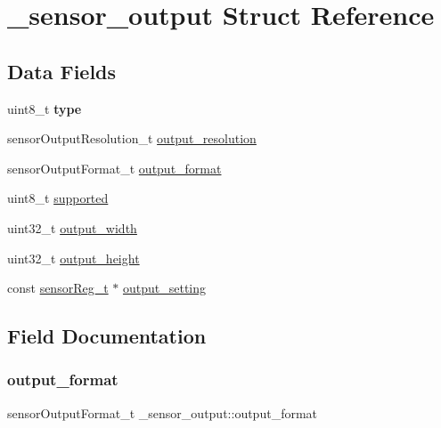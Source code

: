 \hypertarget{struct__sensor__output}{}\section{\+\_\+sensor\+\_\+output Struct Reference}
\label{struct__sensor__output}
\subsection*{Data Fields}
\begin{DoxyCompactItemize}
\item 
\mbox{\label{struct__sensor__output_a0d168a11e98089027c6a95677aca0c9e}} 
uint8\+\_\+t {\bfseries type}
\item 
sensor\+Output\+Resolution\+\_\+t \mbox{\hyperlink{struct__sensor__output_a964e50869cb795d102b326c817c6c6a0}{output\+\_\+resolution}}
\item 
sensor\+Output\+Format\+\_\+t \mbox{\hyperlink{struct__sensor__output_ae045b0c66fe0eb01c94f86201d7201b2}{output\+\_\+format}}
\item 
uint8\+\_\+t \mbox{\hyperlink{struct__sensor__output_adb2d9d82d9f87b0381d6e4b5f9a38e9b}{supported}}
\item 
uint32\+\_\+t \mbox{\hyperlink{struct__sensor__output_abe811bc962208902a3f567d67d245ca3}{output\+\_\+width}}
\item 
uint32\+\_\+t \mbox{\hyperlink{struct__sensor__output_a19b0c8aeddcee4c8cd0d6a790ddcd7cf}{output\+\_\+height}}
\item 
const \mbox{\hyperlink{struct__sensor__reg}{sensor\+Reg\+\_\+t}} $\ast$ \mbox{\hyperlink{struct__sensor__output_ac4abb80d262f5dc8ba0016e1153377a4}{output\+\_\+setting}}
\end{DoxyCompactItemize}


\subsection{Field Documentation}
\mbox{\label{struct__sensor__output_ae045b0c66fe0eb01c94f86201d7201b2}} 
\subsubsection{\texorpdfstring{output\_format}{output\_format}}
{\footnotesize\ttfamily sensor\+Output\+Format\+\_\+t \+\_\+sensor\+\_\+output\+::output\+\_\+format}

